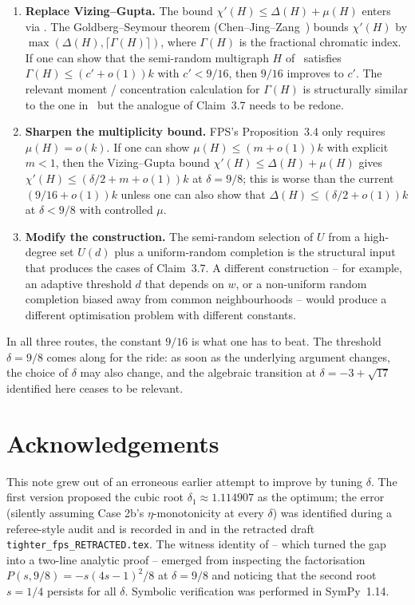 \documentclass[11pt,a4paper]{article}
\theoremstyle{definition}
\newcommand{\chip}{\chi'}
\begin{document}
\begin{enumerate}
\item \textbf{Replace Vizing--Gupta.} The bound
  $\chip(H) \le \Delta(H) + \mu(H)$ enters via
  \cite[Lemma 2.2(ii)]{FPS}. The Goldberg--Seymour theorem
  (Chen--Jing--Zang~\cite{ChenJingZang}) bounds $\chip(H)$ by
  $\max(\Delta(H), \lceil \Gamma(H) \rceil)$, where $\Gamma(H)$ is
  the fractional chromatic index. If one can show that the
  semi-random multigraph $H$ of~\cite{FPS} satisfies
  $\Gamma(H) \le (c' + o(1)) k$ with $c' < 9/16$, then $9/16$
  improves to $c'$. The relevant moment / concentration calculation
  for $\Gamma(H)$ is structurally similar to the one
  in~\cite[\S 3]{FPS} but the analogue of Claim~3.7 needs to be
  redone.
\item \textbf{Sharpen the multiplicity bound.} FPS's
  Proposition~3.4 only requires $\mu(H) = o(k)$. If one can show
  $\mu(H) \le (m + o(1)) k$ with explicit $m < 1$, then the
  Vizing--Gupta bound $\chip(H) \le \Delta(H) + \mu(H)$ gives
  $\chip(H) \le (\delta/2 + m + o(1))k$ at $\delta = 9/8$; this is
  worse than the current $(9/16 + o(1)) k$ unless one can also
  show that $\Delta(H) \le (\delta/2 + o(1)) k$ at $\delta < 9/8$
  with controlled $\mu$.
\item \textbf{Modify the construction.} The semi-random selection
  of $U$ from a high-degree set $U(d)$ plus a uniform-random
  completion is the structural input that produces the cases of
  Claim~3.7. A different construction -- for example, an adaptive
  threshold $d$ that depends on $w$, or a non-uniform random
  completion biased away from common neighbourhoods -- would
  produce a different optimisation problem with different
  constants.
\end{enumerate}

In all three routes, the constant $9/16$ is what one has to beat.
The threshold $\delta = 9/8$ comes along for the ride: as soon as
the underlying argument changes, the choice of $\delta$ may also
change, and the algebraic transition at $\delta = -3 + \sqrt{17}$
identified here ceases to be relevant.

\section*{Acknowledgements}
This note grew out of an erroneous earlier attempt to improve
\cite[Lemma 2.3]{FPS} by tuning $\delta$. The first version proposed
the cubic root $\delta_1 \approx 1.114907$ as the optimum; the error
(silently assuming Case 2b's $\eta$-monotonicity at every $\delta$)
was identified during a referee-style audit and is recorded in
 and in the retracted draft
\texttt{tighter\_fps\_\allowbreak RETRACTED.tex}. The witness
identity of  -- which turned the gap into a
two-line analytic proof -- emerged from inspecting the
factorisation $P(s, 9/8) = -s(4s - 1)^2/8$ at $\delta = 9/8$ and
noticing that the second root $s = 1/4$ persists for all $\delta$.
Symbolic verification was performed in SymPy~1.14.
\end{document}
